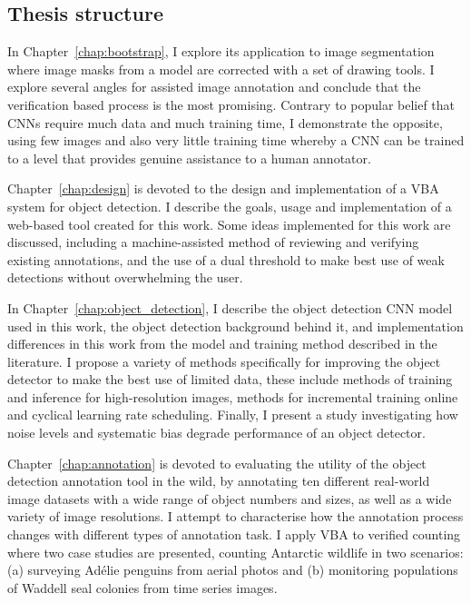 \subsection {Thesis structure} 


In Chapter~\ref{chap:bootstrap}, I explore its application to image segmentation where image masks from a model are corrected with a set of drawing tools. I explore several angles for assisted image annotation and conclude that the verification based process is the most promising. Contrary to popular belief that \gls{CNN}s require much data and much training time, I demonstrate the opposite,  using few images and also very little training time whereby a \gls{CNN} can be trained to a level that provides genuine assistance to a human annotator. 

Chapter~\ref{chap:design} is devoted to the design and implementation of a \gls{VBA} system for object detection. I describe the goals, usage and implementation of a web-based tool created for this work. Some ideas implemented for this work are discussed, including a machine-assisted method of reviewing and verifying existing annotations, and the use of a dual threshold to make best use of weak detections without overwhelming the user.

In Chapter~\ref{chap:object_detection}, I describe the object detection \gls{CNN} model used in this work, the object detection background behind it, and implementation differences in this work from the model and training method described in the literature. I propose a variety of methods specifically for improving the object detector to make the best use of limited data, these include methods of training and inference for high-resolution images, methods for incremental training online and cyclical learning rate scheduling. Finally, I present a study investigating how noise levels and systematic bias degrade performance of an object detector. 

Chapter~\ref{chap:annotation} is devoted to evaluating the utility of the object detection annotation tool in the wild, by annotating ten different real-world image datasets with a wide range of object numbers and sizes, as well as a wide variety of image resolutions. I attempt to characterise how the annotation process changes with different types of annotation task. I apply \gls{VBA} to verified counting where two case studies are presented, counting Antarctic wildlife in two scenarios: (a) surveying Ad\'elie penguins from aerial photos and (b) monitoring populations of Waddell seal colonies from time series images.

